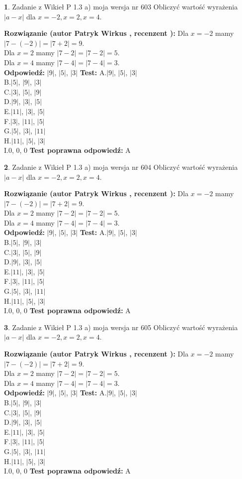 \documentclass[12pt, a4paper]{article}
\theoremstyle{definition} %
\newtheorem{zad}{}
\newcommand{\zadStart}[1]{\begin{zad}#1\newline}
\newcommand{\zadStop}{\end{zad}}
\newcommand{\rozwStart}[2]{\noindent \textbf{Rozwiązanie (autor #1 , recenzent #2): }\newline}
\newcommand{\rozwStop}{\newline}
\newcommand{\odpStart}{\noindent \textbf{Odpowiedź:}\newline}
\newcommand{\odpStop}{\newline}
\newcommand{\testStart}{\noindent \textbf{Test:}\newline}
\newcommand{\testStop}{\newline}
\newcommand{\kluczStart}{\noindent \textbf{Test poprawna odpowiedź:}\newline}
\newcommand{\kluczStop}{\newline}
\begin{document}
\zadStart{Zadanie z Wikieł P 1.3 a) moja wersja nr 603}
Obliczyć wartość wyrażenia $|a - x|$ dla $x=-2,x=2,x=4$.
\zadStop
\rozwStart{Patryk Wirkus}{}
Dla $x = -2$ mamy $|7 - (-2)| = |7 + 2| = 9$.\\
Dla $x = 2$ mamy $|7 - 2| = |7 - 2| = 5$.\\
Dla $x = 4$ mamy $|7 - 4| = |7 - 4| = 3$.\\
\rozwStop
\odpStart
$|9|$, $|5|$, $|3|$
\odpStop
\testStart
A.$|9|$, $|5|$, $|3|$\\
B.$|5|$, $|9|$, $|3|$\\
C.$|3|$, $|5|$, $|9|$\\
D.$|9|$, $|3|$, $|5|$\\
E.$|11|$, $|3|$, $|5|$\\
F.$|3|$, $|11|$, $|5|$\\
G.$|5|$, $|3|$, $|11|$\\
H.$|11|$, $|5|$, $|3|$\\
I.$0$, $0$, $0$
\testStop
\kluczStart
A
\kluczStop



\zadStart{Zadanie z Wikieł P 1.3 a) moja wersja nr 604}
Obliczyć wartość wyrażenia $|a - x|$ dla $x=-2,x=2,x=4$.
\zadStop
\rozwStart{Patryk Wirkus}{}
Dla $x = -2$ mamy $|7 - (-2)| = |7 + 2| = 9$.\\
Dla $x = 2$ mamy $|7 - 2| = |7 - 2| = 5$.\\
Dla $x = 4$ mamy $|7 - 4| = |7 - 4| = 3$.\\
\rozwStop
\odpStart
$|9|$, $|5|$, $|3|$
\odpStop
\testStart
A.$|9|$, $|5|$, $|3|$\\
B.$|5|$, $|9|$, $|3|$\\
C.$|3|$, $|5|$, $|9|$\\
D.$|9|$, $|3|$, $|5|$\\
E.$|11|$, $|3|$, $|5|$\\
F.$|3|$, $|11|$, $|5|$\\
G.$|5|$, $|3|$, $|11|$\\
H.$|11|$, $|5|$, $|3|$\\
I.$0$, $0$, $0$
\testStop
\kluczStart
A
\kluczStop



\zadStart{Zadanie z Wikieł P 1.3 a) moja wersja nr 605}
Obliczyć wartość wyrażenia $|a - x|$ dla $x=-2,x=2,x=4$.
\zadStop
\rozwStart{Patryk Wirkus}{}
Dla $x = -2$ mamy $|7 - (-2)| = |7 + 2| = 9$.\\
Dla $x = 2$ mamy $|7 - 2| = |7 - 2| = 5$.\\
Dla $x = 4$ mamy $|7 - 4| = |7 - 4| = 3$.\\
\rozwStop
\odpStart
$|9|$, $|5|$, $|3|$
\odpStop
\testStart
A.$|9|$, $|5|$, $|3|$\\
B.$|5|$, $|9|$, $|3|$\\
C.$|3|$, $|5|$, $|9|$\\
D.$|9|$, $|3|$, $|5|$\\
E.$|11|$, $|3|$, $|5|$\\
F.$|3|$, $|11|$, $|5|$\\
G.$|5|$, $|3|$, $|11|$\\
H.$|11|$, $|5|$, $|3|$\\
I.$0$, $0$, $0$
\testStop
\kluczStart
A
\kluczStop
\end{document}
